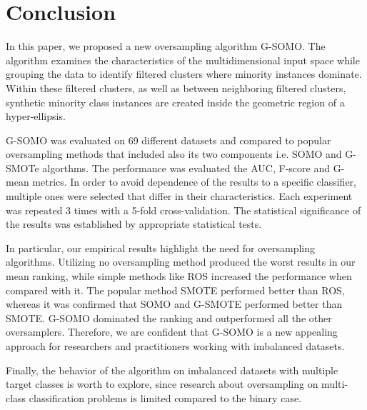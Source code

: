 \documentclass[parskip=full]{scrartcl}
\begin{document}
\section{Conclusion}

In this paper, we proposed a new oversampling algorithm G-SOMO. The algorithm examines the characteristics of the multidimensional input space while grouping the data to identify filtered clusters where minority instances dominate. Within these filtered clusters, as well as between neighboring filtered clusters, synthetic minority class instances are created inside the geometric region of a hyper-ellipsis.

G-SOMO was evaluated on 69 different datasets and compared to popular oversampling methods that included also its two components i.e. SOMO and G-SMOTe algorthms. The performance was evaluated the AUC, F-score and G-mean metrics. In order to avoid dependence of the results to a specific classifier, multiple ones were selected that differ in their characteristics. Each experiment was repeated 3 times with a 5-fold cross-validation. The statistical significance of the results was established by appropriate statistical tests.

In particular, our empirical results highlight the need for oversampling algorithms. Utilizing no oversampling method produced the worst results in our mean ranking, while simple methods like ROS increased the performance when compared with it. The popular method SMOTE performed better than ROS, whereas it was confirmed that SOMO and G-SMOTE performed better than SMOTE. G-SOMO dominated the ranking and outperformed all the other oversamplers. Therefore, we are confident that G-SOMO is a new appealing approach for researchers and practitioners working with imbalanced datasets.

Finally, the behavior of the algorithm on imbalanced datasets with multiple target classes is worth to explore, since research about oversampling on multi-class classification problems is limited compared to the binary case.



\end{document}
